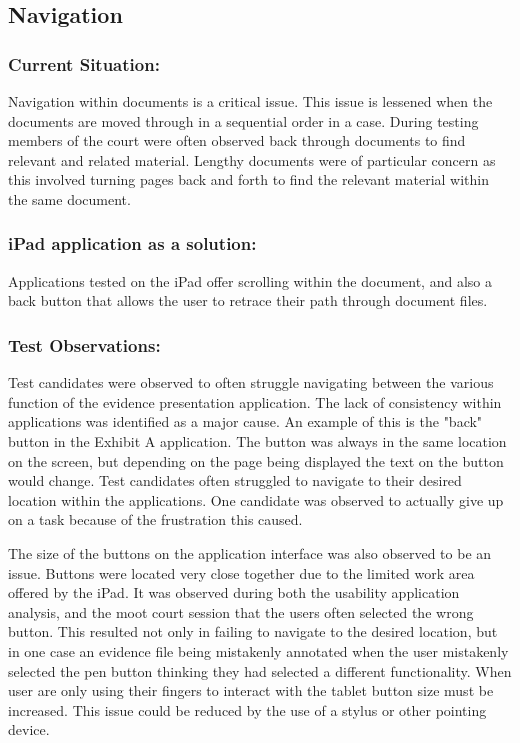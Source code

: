 \subsection{Navigation}
\subsubsection{Current Situation:}
Navigation within documents is a critical issue. This issue is lessened when the documents are moved through in a sequential order in a case. During testing members of the court were often observed back through documents to find relevant and related material. Lengthy documents were of particular concern as this involved turning pages back and forth to find the relevant material within the same document.

\subsubsection{iPad application as a solution:}
Applications tested on the iPad offer scrolling within the document, and also a back button that allows the user to retrace their path through document files.

\subsubsection{Test Observations:}
Test candidates were observed to often struggle navigating between the various function of the evidence presentation application. The lack of consistency within applications was identified as a major cause. An example of this is the "back" button in the Exhibit A application. The button was always in the same location on the screen, but depending on the page being displayed the text on the button would change. Test candidates often struggled to navigate to their desired location within the applications. One candidate was observed to actually give up on a task because of the frustration this caused. 

The size of the buttons on the application interface was also observed to be an issue. Buttons were located very close together due to the limited work area offered by the iPad. It was observed during both the usability application analysis, and the moot court session that the users often selected the wrong button. This resulted not only in failing to navigate to the desired location, but in one case an evidence file being mistakenly annotated when the user mistakenly selected the pen button thinking they had selected a different functionality. When user are only using their fingers to interact with the tablet button size must be increased. This issue could be reduced by the use of a stylus or other pointing device.
